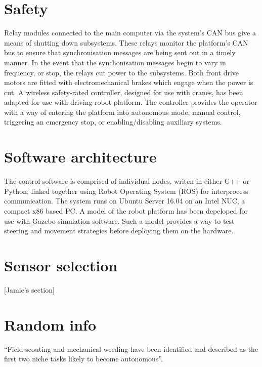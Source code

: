 \documentclass[preprint,authoryear,12pt]{elsarticle}
\begin{document}
\section{Safety}
Relay modules connected to the main computer via the system's CAN bus give a means of shutting down subsystems.
These relays monitor the platform's CAN bus to ensure that synchronisation messages are being sent out in a timely manner.
In the event that the synchonisation messages begin to vary in frequency, or stop, the relays cut power to the subsystems.
Both front drive motors are fitted with electromechanical brakes which engage when the power is cut.
A wireless safety-rated controller, designed for use with cranes, has been adapted for use with driving robot platform.
The controller provides the operator with a way of entering the platform into autonomous mode, manual control, triggering an emergency stop, or enabling/disabling auxiliary systems.

\section{Software architecture}
\label{sect:software}
The control software is comprised of individual nodes, writen in either C++ or Python, linked together using Robot Operating System (ROS) for interprocess communication.
The system runs on Ubuntu Server 16.04 on an Intel NUC, a compact x86 based PC.
A model of the robot platform has been depeloped for use with Gazebo simulation software.
Such a model provides a way to test steering and movement strategies before deploying them on the hardware.

\section{Sensor selection}
[Jamie's section]

\section{Random info}

``Field scouting and mechanical weeding have been identified and described as the first two niche tasks likely to become autonomous''\citep{Blackmore2004}.


\end{document}
